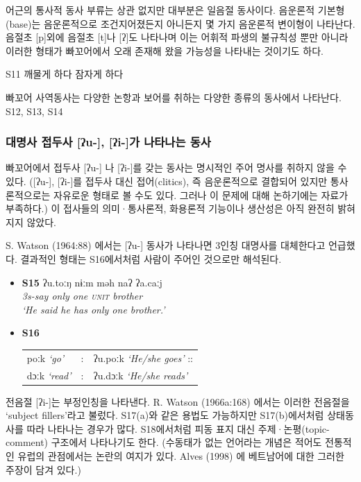 어근의 통사적 동사 부류는 상관 없지만 대부분은 일음절 동사이다. 음운론적 기본형(base)는 음운론적으로 조건지어졌든지 아니든지 몇 가지 음운론적 변이형이 나타난다. 음절초 [p]외에 음절초 [t]나 [ʔ]도 나타나며 이는 어휘적 파생의 불규칙성 뿐만 아니라 이러한 형태가 빠꼬어에서 오래 존재해 왔을 가능성을 나타내는 것이기도 하다.

S11 깨물게 하다 잠자게 하다

빠꼬어 사역동사는 다양한 논항과 보어를 취하는 다양한 종류의 동사에서 나타난다.
S12, S13, S14

\subsubsection{대명사 접두사 [ʔu-], [ʔi-]가 나타나는 동사}
빠꼬어에서 접두사 [ʔu-] 나 [ʔi-]를 갖는 동사는
명시적인 주어 명사를 취하지 않을 수 있다. ([ʔu-], [ʔi-]를 접두사 대신 접어(clitics), 즉 음운론적으로 결합되어 있지만 통사론적으로는 자유로운 형태로 볼 수도 있다. 그러나 이 문제에 대해 논하기에는 자료가 부족하다.)
이 접사들의 의미·통사론적, 화용론적 기능이나 생산성은 아직 완전히 밝혀지지 않았다.

S. Watson (1964:88) 에서는 [ʔu-] 동사가 나타나면 3인칭 대명사를 대체한다고 언급했다. 결과적인 형태는 S16에서처럼 사람이 주어인 것으로만 해석된다.
\begin{itemize}
\item \textbf{S15}
\gll ʔu.toːŋ nɨːm məh naʔ ʔa.caːj\\
\itshape{3s-say} \itshape{only} \itshape{one} \textsc{unit} \itshape{brother} \\
`He said he has only one brother.'

\item \textbf{S16}

\begin{tabular}{lcl}
poːk {\itshape{`go'}} & : & ʔu.poːk {\itshape{`He/she goes'}} :: \\
dɔːk {\itshape{`read'}} & : & ʔu.dɔːk {\itshape{`He/she reads'}}
\end{tabular}
\end{itemize}

전음절 [ʔi-]는 부정인칭을 나타낸다. R. Watson (1966a:168) 에서는 이러한 전음절을 `subject fillers'라고 불렀다. S17(a)와 같은 용법도 가능하지만 S17(b)에서처럼 상태동사를 따라 나타나는 경우가 많다. S18에서처럼 피동 표지 대신 주제·논평(topic-comment) 구조에서 나타나기도 한다. (수동태가 없는 언어라는 개념은 적어도 전통적인 유럽의 관점에서는 논란의 여지가 있다. Alves (1998) 에 베트남어에 대한 그러한 주장이 담겨 있다.)

